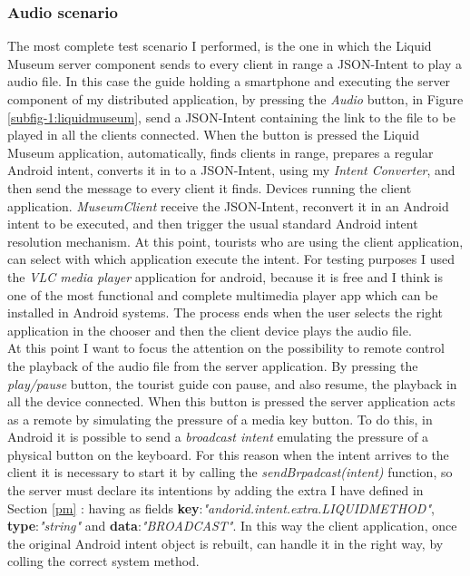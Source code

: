 \subsubsection{Audio scenario}
The most complete test scenario I performed, is the one in which the Liquid Museum server component sends to every client in range a JSON-Intent to play a audio file. In this case the guide holding a smartphone and executing the server component of my distributed application, by pressing the \textit{Audio} button, in Figure \ref{subfig-1:liquidmuseum}, send a JSON-Intent containing the link to the file to be played in all the clients connected. When the button is pressed the Liquid Museum application, automatically, finds clients in range, prepares a regular Android intent, converts it in to a JSON-Intent, using my \textit{Intent Converter}, and then send the message to every client it finds. Devices running the client application. \textit{MuseumClient} receive the JSON-Intent, reconvert it in an Android intent to be executed, and then trigger the usual standard Android intent resolution mechanism. At this point, tourists who are using the client application, can select with which application execute the intent. For testing purposes I used the \textit{VLC media player} application for android, because it is free and I think is one of the most functional and complete multimedia player app which can be installed in Android systems. The process ends when the user selects the right application in the chooser and then the client device plays the audio file.\\
At this point I want to focus the attention on the possibility to remote control the playback of the audio file from the server application. By pressing the \textit{play/pause} button, the tourist guide con pause, and also resume, the playback in all the device connected. When this button is pressed the server application acts as a remote by simulating the pressure of a media key button. To do this, in Android it is possible to send a \textit{broadcast intent} emulating the pressure of a physical button on the keyboard. For this reason when the intent arrives to the client it is necessary to start it by calling the \textit{sendBrpadcast(intent)} function, so the server must declare its intentions by adding the extra I have defined in Section \ref{pm} : having as fields \textbf{key}:\textit{"andorid.intent.extra.LIQUIDMETHOD"}, \textbf{type}:\textit{"string"} and \textbf{data}:\textit{"BROADCAST"}. In this way the client application, once the original Android intent object is rebuilt, can handle it in the right way, by colling the correct system method.
